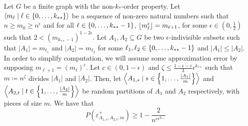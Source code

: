     \lemma[Claim 4.13]\label{bound_on_the_probability_of_a_subpair_having_no_exceptions}
        Let $G$ be a finite graph with the non-$k_{*}$-order property.
        Let $\left< m_\ell \mid \ell \in \left\{ 0, \dots, k_{**} \right\} \right>$ be a sequence of non-zero natural numbers such that
        $n \geq m_0 \geq n^\epsilon$ and for all $\ell \in \left\{ 0, \dots, k_{**}-1 \right\}$, $\left\lfloor m_\ell^\epsilon \right\rfloor = m_{\ell+1}$,
        for some $\epsilon \in (0, \frac{1}{2})$ such that $2 < (m_{k_{**}-1})^{1-2\epsilon}$.
        Let $A_1, A_2 \subseteq G$ be two $\epsilon$-indivisible subsets such that $|A_1| = m_{\ell_1}$ and $|A_2| = m_{\ell_2}$
        for some $\ell_1, \ell_2 \in \left\{ 0, \dots, k_{**}-1 \right\}$ and $|A_1| \leq |A_2|$.
        In order to simplify computation, we will assume some approximation error by supposing $m_{\ell+1} = (m_{\ell})^\epsilon$.
        Let $c \in (0, 1-\epsilon)$ and $\zeta \leq \frac{1 - \epsilon - c}{3}\epsilon^{k_{**}}$ such that
        $m \coloneqq n^\zeta$ divides $|A_1|$ and $|A_2|$.
        Then, let $\left< A_{1,s} \mid s \in \left\{ 1, \dots, \frac{|A_1|}{m} \right\} \right>$ and
        $\left< A_{2,t} \mid t \in \left\{ 1, \dots, \frac{|A_2|}{m} \right\} \right>$ be random partitions of $A_1$ and $A_2$
        respectively, with pieces of size $m$.
        We have that
        \[
            P(\varepsilon^+_{A_{1,s},A_{2,t},m}) \geq 1 - \frac{2}{n^{c\epsilon^{k_{**}}}}
        \]
